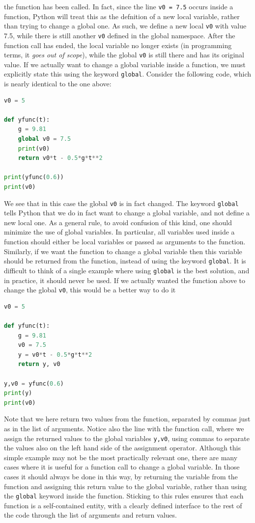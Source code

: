 \documentclass[graybox,envcountchap,sectrefs,final]{svmonodo}
\begin{document}
the function has been called. In fact, since the line \texttt{v0 = 7.5} occurs inside a function, Python will treat this as
the defnition of a new local variable, rather than trying to change a global one. As such, we define a new local \texttt{v0} with
value 7.5, while there is still another \texttt{v0} defined in the global namespace. After the function call has ended, the
local variable no longer exists (in programming terms, it \emph{goes out of scope}), while the global \texttt{v0} is still there and has
its original value. If we actually want to change a global variable inside a function, we must explicitly state this using
the keyword \texttt{global}. Consider the following code, which is nearly identical to the one above:
\begin{lstlisting}[language=Python,style=blue1]
v0 = 5

def yfunc(t):
    g = 9.81
    global v0 = 7.5
    print(v0)
    return v0*t - 0.5*g*t**2

print(yfunc(0.6))
print(v0)
\end{lstlisting}
We see that in this case the global \texttt{v0} is in fact changed. The keyword \texttt{global} tells Python that we do in fact want to
change a global variable, and not define a new local one. As a general
rule, to avoid confusion of this kind, one should minimize the use of global variables.
In particular, all variables used inside a
function should either be local variables or passed as arguments to the function. Similarly, if we want the function
to change a global variable then this variable should be returned from the function, instead of using the keyword \texttt{global}.
It is difficult to think of a single example where using \texttt{global} is the best solution, and in practice, it should
never be used. If we actually wanted the function above to change the global \texttt{v0}, this would be a better way to do it
\begin{lstlisting}[language=Python,style=blue1]
v0 = 5

def yfunc(t):
    g = 9.81
    v0 = 7.5
    y = v0*t - 0.5*g*t**2
    return y, v0

y,v0 = yfunc(0.6)
print(y)
print(v0)
\end{lstlisting}
Note that we here return two values from the function, separated by commas just as in the list of arguments. Notice also the
line with the function call, where we assign the returned values to the global variables \texttt{y,v0}, using commas to separate
the values also on the left hand side of the assignment operator. Although this simple example may not be the most practically
relevant one,  there are many cases where it is useful for a function call to change a global variable.  In those
cases it should always  be done in this way, by returning the variable from the function and assigning this return value to the
global variable, rather than using the \texttt{global} keyword inside the function. Sticking to this rules ensures that
each function is a self-contained entity, with a clearly defined interface to the rest of the code through the list of
arguments and return values.
\end{document}
